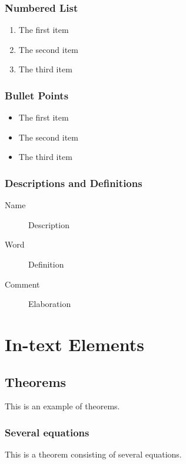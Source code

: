 \documentclass[11pt,fleqn]{book} %
\begin{document}
\subsection{Numbered List}

\begin{enumerate}
\item The first item
\item The second item
\item The third item
\end{enumerate}

\subsection{Bullet Points}

\begin{itemize}
\item The first item
\item The second item
\item The third item
\end{itemize}

\subsection{Descriptions and Definitions}

\begin{description}
\item[Name] Description
\item[Word] Definition
\item[Comment] Elaboration
\end{description}

\chapter{In-text Elements}

\section{Theorems}

This is an example of theorems.

\subsection{Several equations}
This is a theorem consisting of several equations.
\end{document}
